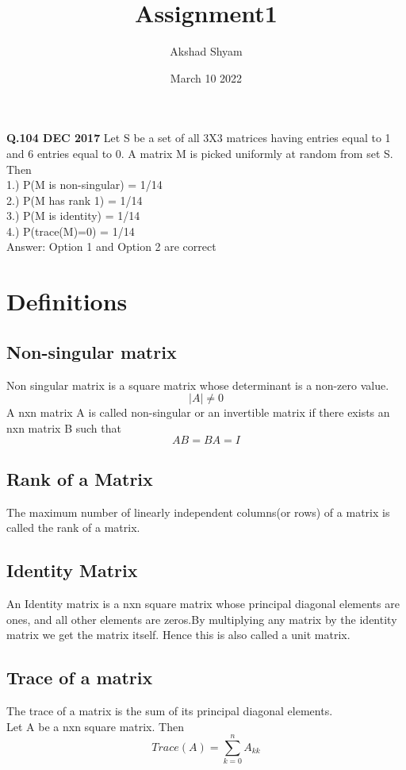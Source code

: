 \documentclass{article}
\title{\textbf{Assignment1}}
\author{Akshad Shyam}
\date{March 10 2022}
\begin{document}
\maketitle

\textbf{Q.104 DEC 2017} Let S be a set of all 3X3 matrices having entries equal to 1 and 6 entries equal to 0. A matrix M is picked uniformly at random from set S. Then\\
1.) P(M is non-singular) = 1/14 \\
2.) P(M has rank 1) = 1/14 \\
3.) P(M is identity) = 1/14 \\
4.) P(trace(M)=0) = 1/14 \\

Answer: Option 1 and Option 2 are correct\\

\section{Definitions}
\subsection{Non-singular matrix}
Non singular matrix is a square matrix whose determinant is a non-zero value.
\begin{equation}
    |A| \ne 0
\end{equation}
A nxn matrix A is called non-singular or an invertible matrix if there exists an nxn matrix B such that
\begin{equation}
    AB = BA = I
\end{equation}
\subsection{Rank of a Matrix}
The maximum number of linearly independent columns(or rows) of a matrix is called the rank of a matrix.
\subsection{Identity Matrix}
An Identity matrix is a nxn square matrix whose principal diagonal elements are ones, and all other elements are zeros.By multiplying any matrix by the identity matrix we get the matrix itself. Hence this is also called a unit matrix.
\subsection{Trace of a matrix}
The trace of a matrix is the sum of its principal diagonal elements. \\
Let A be a nxn square matrix. Then\\
\begin{equation}
    Trace(A) = \sum_{k=0}^{n} A_{kk}
\end{equation}
\end{document}
